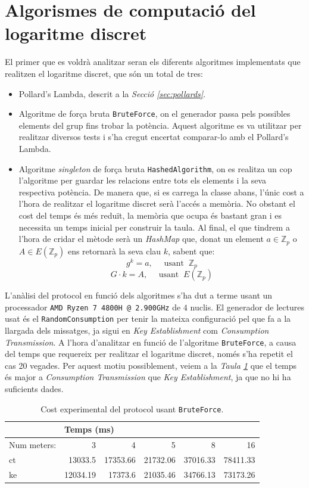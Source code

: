 \section{Algorismes de computació del logaritme discret}
El primer que es voldrà analitzar seran els diferents algoritmes implementats que realitzen el logaritme discret, que són un total de tres:
\begin{itemize}
	\item Pollard's Lambda, descrit a la \textit{Secció \ref{sec:pollards}}.
	\item Algoritme de força bruta \texttt{BruteForce}, on el generador passa pels possibles elements del grup fins trobar la potència. Aquest algoritme es va utilitzar per realitzar diversos tests i s'ha cregut encertat comparar-lo amb el Pollard's Lambda.
	\item Algoritme \textit{singleton} de força bruta \texttt{HashedAlgorithm}, on es realitza un cop l'algoritme per guardar les relacions entre tots els elements i la seva respectiva potència. De manera que, si es carrega la classe abans, l'únic cost a l'hora de realitzar el logaritme discret serà l'accés a memòria. No obstant el cost del temps és més reduït, la memòria que ocupa és bastant gran i es necessita un temps inicial per construir la taula. Al final, el que tindrem a l'hora de cridar el mètode serà un \textit{HashMap} que, donat un element $a \in \mathbb{Z}_p$ o  $A \in E(\mathbb{Z}_p)$ ens retornarà la seva clau $k$, sabent que:
	\[g^k = a ,\quad \textrm{ usant  }\ \mathbb{Z}_p\]
	\[G \cdot k = A,\quad \textrm{ usant  }\ E(\mathbb{Z}_p)\]
\end{itemize}
L'anàlisi del protocol en funció dels algoritmes s'ha dut a terme usant un processador \texttt{AMD Ryzen 7 4800H @ 2.900GHz} de $4$ nuclis. El generador de lectures usat és el \texttt{RandomConsumption} per tenir la mateixa configuració pel que fa a la llargada dels missatges, ja sigui en \textit{Key Establishment} com \textit{Consumption Transmission}. A l'hora d'analitzar en funció de l'algoritme \texttt{BruteForce}, a causa del temps que requereix per realitzar el logaritme discret, només s'ha repetit el cas 20 vegades. Per aquest motiu possiblement, veiem a la \textit{Taula \ref{tab:brute}} que el temps és major a \textit{Consumption Transmission} que \textit{Key Establishment}, ja que no hi ha suficients dades.
	\begin{table}[H]
		\centering
		\begin{tabular}{lrrrrr}
			\centering
			&\multicolumn{5}{l}{\centering Temps (ms)}\\
			\toprule
			Num meters: &           3  &       4  &           5  &            8  &            16 \\
			\midrule
			ct &  13033.5 &  17353.66 &  21732.06 &  37016.33 &  78411.33 \\
			ke &  12034.19 &  17373.6 &  21035.46 &  34766.13 &  73173.26 \\
			\bottomrule
		\end{tabular}
		\caption{Cost experimental del protocol usant \texttt{BruteForce}.}
		\label{tab:brute}
	\end{table}
